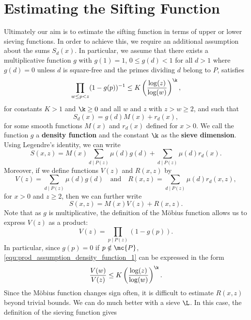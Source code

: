   \section{Estimating the Sifting Function}
    Ultimately our aim is to estimate the sifting function in terms of upper or lower sieving functions. In order to achieve this, we require an additional assumption about the sums $S_{d}(x)$. In particular, we assume that there exists a multiplicative function $g$ with $g(1) = 1$, $0 \le g(d) < 1$ for all $d > 1$ where $g(d) = 0$ unless $d$ is square-free and the primes dividing $d$ belong to ${P}$, satisfies
    \begin{equation}\label{equ:prod_assumption_density_function_1}
      \prod_{w \le p < z}(1-g(p))^{-1} \le K\left(\frac{\log(z)}{\log(w)}\right)^{\k},
    \end{equation}
    for constants $K > 1$ and $\k \ge 0$ and all $w$ and $z$ with $z > w \ge 2$, and such that  
    \begin{equation}\label{equ:d_multiple_sifting_function}
      S_{d}(x) = g(d)M(x)+r_{d}(x),
    \end{equation}
    for some smooth functions $M(x)$ and $r_{d}(x)$ defined for $x > 0$. We call the function $g$ a \textbf{density function} and the constant $\k$ as the \textbf{sieve dimension}. Using Legendre's identity, we can write
    \[
      S(x,z) = M(x)\sum_{d \mid P(z)}\mu(d)g(d)+\sum_{d \mid P(z)}\mu(d)r_{d}(x).
    \]
    Moreover, if we define functions $V(z)$ and $R(x,z)$ by
    \[
      V(z) = \sum_{d \mid P(z)}\mu(d)g(d) \quad \text{and} \quad R(x,z) = \sum_{d \mid P(z)}\mu(d)r_{d}(x,z),
    \]
    for $x > 0$ and $z \ge 2$, then we can further write
    \[
      S(x,z) = M(x)V(z)+R(x,z).
    \]
    Note that as $g$ is multiplicative, the definition of the M\"obius function allows us to express $V(z)$ as a product:
    \begin{equation}\label{equ:V_product_formula}
      V(z) = \prod_{p \mid P(z)}(1-g(p)).
    \end{equation}
    In particular, since $g(p) = 0$ if $p \notin \mc{P}$, \cref{equ:prod_assumption_density_function_1} can be expressed in the form
    \begin{equation}\label{equ:prod_assumption_density_function_2}
      \frac{V(w)}{V(z)} \le K\left(\frac{\log(z)}{\log(w)}\right)^{\k}.
    \end{equation}
    Since the M\"obius function changes sign often, it is difficult to estimate $R(x,z)$ beyond trivial bounds. We can do much better with a sieve $\L$. In this case, the definition of the sieving function gives

